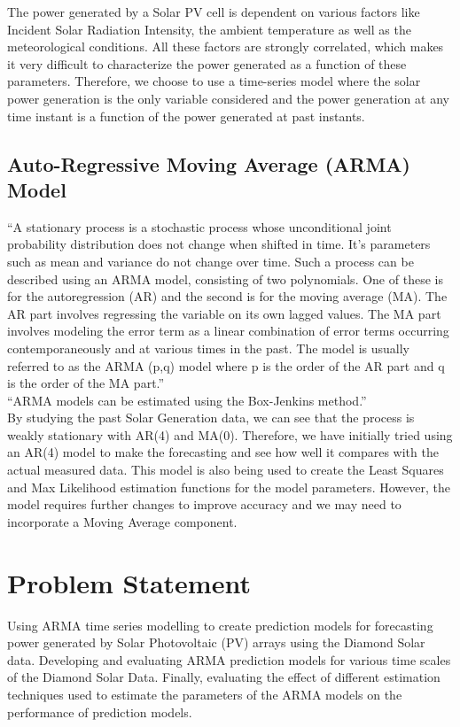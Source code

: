 \documentclass[journal]{IEEEtran}
\begin{document}
The power generated by a Solar PV cell is dependent on various factors like Incident Solar Radiation Intensity, the ambient temperature as well as the meteorological conditions. All these factors are strongly correlated, which makes it very difficult to characterize the power generated as a function of these parameters. Therefore, we choose to use a time-series model where the solar power generation is the only variable considered and the power generation at any time instant is a function of the power generated at past instants.

\subsection{Auto-Regressive Moving Average (ARMA) Model}

“A stationary process is a stochastic process whose unconditional joint probability distribution does not change when shifted in time. It’s parameters such as mean and variance do not change over time. Such a process can be described using an ARMA model, consisting of two polynomials. One of these is for the autoregression (AR) and the second is for the moving average (MA). The AR part involves regressing the variable on its own lagged values. The MA part involves modeling the error term as a linear combination of error terms occurring contemporaneously and at various times in the past. The model is usually referred to as the ARMA (p,q) model where p is the order of the AR part and q is the order of the MA part.”
\\
“ARMA models can be estimated using the Box-Jenkins method.”
\\
By studying the past Solar Generation data, we can see that the process is weakly stationary with AR(4) and MA(0). Therefore, we have initially tried using an AR(4) model to make the forecasting and see how well it compares with the actual measured data. This model is also being used to create the Least Squares and Max Likelihood estimation functions for the model parameters. However, the model requires further changes to improve accuracy and we may need to incorporate a Moving Average component.


\section{Problem Statement}

Using ARMA time series modelling to create prediction models for forecasting power generated by Solar Photovoltaic (PV) arrays using the Diamond Solar data. Developing and evaluating ARMA prediction models for various time scales of the Diamond Solar Data. Finally, evaluating the effect of different estimation techniques used to estimate the parameters of the ARMA models on the performance of prediction models.
\end{document}
